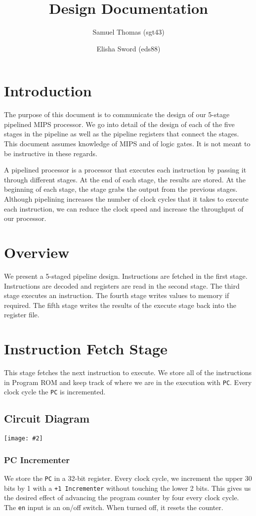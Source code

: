 \documentclass[10pt]{article}
\title{Design Documentation}
\author{Samuel Thomas (sgt43) \and Elisha Sword (eds88)}
\newcommand{\diagram}[2][1]{\begin{center}\texttt{[image: \#2]}\end{center}}
\begin{document}
\maketitle

\section{Introduction}
The purpose of this document is to communicate the design of our 5-stage pipelined MIPS processor. 
We go into detail of the design of each of the five stages in the pipeline as well as the pipeline registers that connect the stages.
This document assumes knowledge of MIPS and of logic gates. It is not meant to be instructive in these regards. 

A pipelined processor is a processor that executes each instruction by passing it through different stages. At the end of each stage, the results are stored.
At the beginning of each stage, the stage grabs the output from the previous stages. Although pipelining increases the number of clock cycles
that it takes to execute each instruction, we can reduce the clock speed and increase the throughput of our processor.

\section{Overview}
We present a 5-staged pipeline design. Instructions are fetched in the first stage. Instructions are decoded and registers are read in the second stage.
The third stage executes an instruction. The fourth stage writes values to memory if required.
The fifth stage writes the results of the execute stage back into the register file.

\section{Instruction Fetch Stage}
This stage fetches the next instruction to execute. We store all of the instructions in Program ROM and keep track of where we are in the execution with \texttt{PC}.
Every clock cycle the \texttt{PC} is incremented.

\subsection{Circuit Diagram}
\diagram[0.8]{fetch}
\subsubsection{PC Incrementer}
We store the \texttt{PC} in a 32-bit register. Every clock cycle, we increment the upper 30 bits by 1 with a \texttt{+1 Incrementer} without touching the lower 2 bits.
This gives us the desired effect of advancing the program counter by four every clock cycle.
The \texttt{en} input is an on/off switch. When turned off, it resets the counter. 
\end{document}
